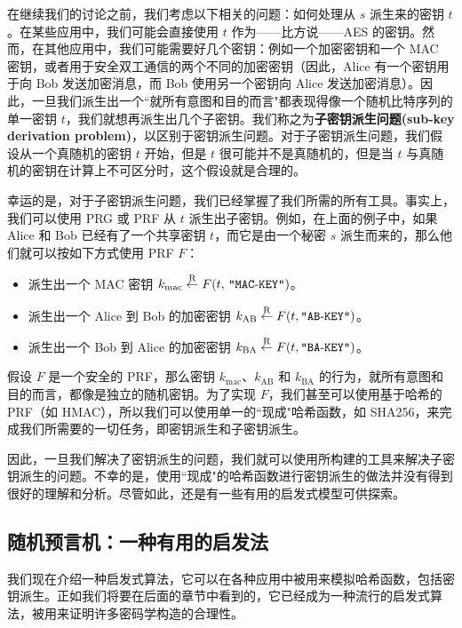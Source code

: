 \begin{snote}[子密钥的派生。]
在继续我们的讨论之前，我们考虑以下相关的问题：如何处理从 $s$ 派生来的密钥 $t$。在某些应用中，我们可能会直接使用 $t$ 作为——比方说——AES 的密钥。然而，在其他应用中，我们可能需要好几个密钥：例如一个加密密钥和一个 MAC 密钥，或者用于安全双工通信的两个不同的加密密钥（因此，Alice 有一个密钥用于向 Bob 发送加密消息，而 Bob 使用另一个密钥向 Alice 发送加密消息）。因此，一旦我们派生出一个``就所有意图和目的而言"都表现得像一个随机比特序列的单一密钥 $t$，我们就想再派生出几个子密钥。我们称之为\textbf{子密钥派生问题(sub-key derivation problem)}，以区别于密钥派生问题。对于子密钥派生问题，我们假设从一个真随机的密钥 $t$ 开始，但是 $t$ 很可能并不是真随机的，但是当 $t$ 与真随机的密钥在计算上不可区分时，这个假设就是合理的。

幸运的是，对于子密钥派生问题，我们已经掌握了我们所需的所有工具。事实上，我们可以使用 PRG 或 PRF 从 $t$ 派生出子密钥。例如，在上面的例子中，如果 Alice 和 Bob 已经有了一个共享密钥 $t$，而它是由一个秘密 $s$ 派生而来的，那么他们就可以按如下方式使用 PRF $F$：
\begin{itemize}
	\item 派生出一个 MAC 密钥 $k_\mathrm{mac}\overset{\rm R}\leftarrow F(t,\,\texttt{"MAC}\text{-}\texttt{KEY"})$。
	\item 派生出一个 Alice 到 Bob 的加密密钥 $k_\mathrm{AB}\overset{\rm R}\leftarrow F(t,\texttt{"AB}\text{-}\texttt{KEY"})$。
	\item 派生出一个 Bob 到 Alice 的加密密钥 $k_\mathrm{BA}\overset{\rm R}\leftarrow F(t,\texttt{"BA}\text{-}\texttt{KEY"})$。
\end{itemize}
假设 $F$ 是一个安全的 PRF，那么密钥 $k_\mathrm{mac}$、$k_\mathrm{AB}$ 和 $k_\mathrm{BA}$ 的行为，就所有意图和目的而言，都像是独立的随机密钥。为了实现 $F$，我们甚至可以使用基于哈希的 PRF（如 HMAC），所以我们可以使用单一的``现成"哈希函数，如 SHA256，来完成我们所需要的一切任务，即密钥派生和子密钥派生。

因此，一旦我们解决了密钥派生的问题，我们就可以使用所构建的工具来解决子密钥派生的问题。不幸的是，使用``现成"的哈希函数进行密钥派生的做法并没有得到很好的理解和分析。尽管如此，还是有一些有用的启发式模型可供探索。
\end{snote}

\subsection{随机预言机：一种有用的启发法}\label{subsec:8-10-2}

我们现在介绍一种启发式算法，它可以在各种应用中被用来模拟哈希函数，包括密钥派生。正如我们将要在后面的章节中看到的，它已经成为一种流行的启发式算法，被用来证明许多密码学构造的合理性。

